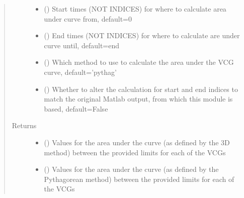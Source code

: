 \documentclass[letterpaper,10pt,english]{sphinxmanual}
\begin{document}
\begin{fulllineitems}
\begin{quote}
\begin{description}
\begin{itemize}
\item {} 
\sphinxAtStartPar
{} (\sphinxstyleliteralemphasis{\sphinxupquote{, }}) \textendash{} Start times (NOT INDICES) for where to calculate area under curve from, default=0

\item {} 
\sphinxAtStartPar
{} (\sphinxstyleliteralemphasis{\sphinxupquote{, }}) \textendash{} End times (NOT INDICES) for where to calculate are under curve until, default=end

\item {} 
\sphinxAtStartPar
{} (\sphinxstyleliteralemphasis{\sphinxupquote{, }}\sphinxstyleliteralemphasis{\sphinxupquote{, }}) \textendash{} Which method to use to calculate the area under the VCG curve, default=’pythag’

\item {} 
\sphinxAtStartPar
{} (\sphinxstyleliteralemphasis{\sphinxupquote{, }}) \textendash{} Whether to alter the calculation for start and end indices to match the original Matlab output, from which this
module is based, default=False

\end{itemize}

\item[{Returns}] \leavevmode
\sphinxAtStartPar
\begin{itemize}
\item {} 
\sphinxAtStartPar
{} () \textendash{} Values for the area under the curve (as defined by the 3D method) between the provided limits for each of the
VCGs

\item {} 
\sphinxAtStartPar
{} () \textendash{} Values for the area under the curve (as defined by the Pythagorean method) between the provided limits for each
of the VCGs


\end{itemize}
\end{description}
\end{quote}
\end{fulllineitems}
\end{document}
